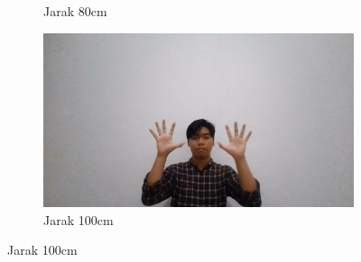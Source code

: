 \begin{figure}[H]
\begin{subfigure}{0.4\textwidth}
    \caption{Jarak 80cm}
    \label{fig:jarak80cm}
  \end{subfigure}
  \begin{subfigure}{0.4\textwidth}
    \centering
    \includegraphics[width=\linewidth]{../Gambar/100cm.jpg}
    \caption{Jarak 100cm}
    \label{fig:jarak100cm}
  \end{subfigure}
\end{figure}


